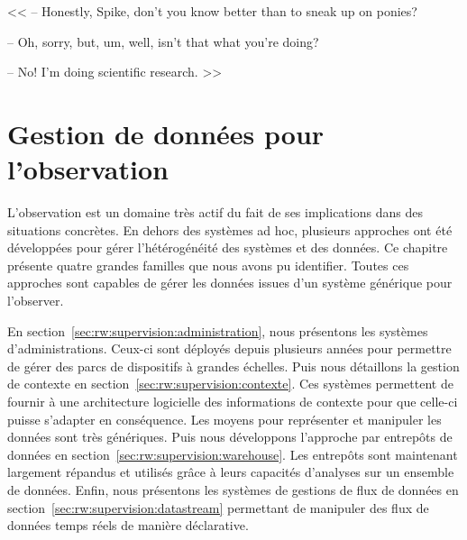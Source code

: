 \begin{savequote}[6cm]
<< -- Honestly, Spike, don't you know better than to sneak up on ponies?

-- Oh, sorry, but, um, well, isn't that what you're doing?

-- No! I'm doing scientific research. >>
\end{savequote}

\chapter{Gestion de données pour l'observation}\label{chap:rw:supervision}
\chaptertoc

L'observation est un domaine très actif du fait de ses implications dans des situations concrètes. En dehors des systèmes ad hoc, plusieurs approches ont été développées pour gérer l'hétérogénéité des systèmes et des données. Ce chapitre présente quatre grandes familles que nous avons pu identifier. Toutes ces approches sont capables de gérer les données issues d'un système générique pour l'observer.

En section~\ref{sec:rw:supervision:administration}, nous présentons les systèmes d'administrations. Ceux-ci sont déployés depuis plusieurs années pour permettre de gérer des parcs de dispositifs à grandes échelles. Puis nous détaillons la gestion de contexte en section~\ref{sec:rw:supervision:contexte}. Ces systèmes permettent de fournir à une architecture logicielle des informations de contexte pour que celle-ci puisse s'adapter en conséquence. Les moyens pour représenter et manipuler les données sont très génériques. Puis nous développons l'approche par entrepôts de données en section~\ref{sec:rw:supervision:warehouse}. Les entrepôts sont maintenant largement répandus et utilisés grâce à leurs capacités d'analyses sur un ensemble de données. Enfin, nous présentons les systèmes de gestions de flux de données en section~\ref{sec:rw:supervision:datastream} permettant de manipuler des flux de données temps réels de manière déclarative.






